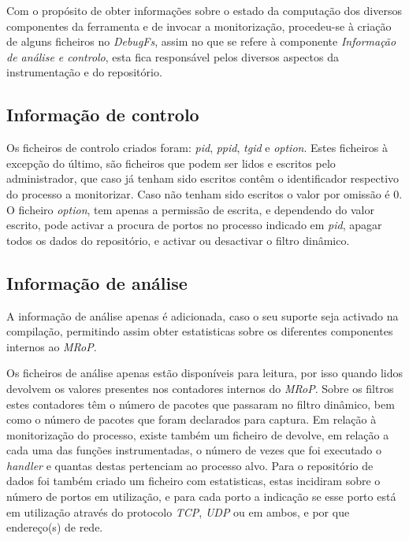 Com o propósito de obter informações sobre o estado da computação dos diversos componentes da ferramenta e de invocar a monitorização, procedeu-se à criação de alguns ficheiros no \textit{DebugFs}, assim no que se refere à componente \textit{Informação de análise e controlo}, esta fica responsável pelos diversos aspectos da instrumentação e do repositório.

\subsection{Informação de controlo}

Os ficheiros de controlo criados foram: \textit{pid}, \textit{ppid}, \textit{tgid} e \textit{option}.
Estes ficheiros à excepção do último, são ficheiros que podem ser lidos e escritos pelo administrador, que caso já tenham sido escritos contêm o identificador respectivo do processo a monitorizar.
Caso não tenham sido escritos o valor por omissão é 0.
O ficheiro \textit{option}, tem apenas a permissão de escrita, e dependendo do valor escrito, pode activar a procura de portos no processo indicado em \textit{pid}, apagar todos os dados do repositório, e activar ou desactivar o filtro dinâmico.

\subsection{Informação de análise}
A informação de análise apenas é adicionada, caso o seu suporte seja activado na compilação, permitindo assim obter estatisticas sobre os diferentes componentes internos ao \textit{MRoP}.

Os ficheiros de análise apenas estão disponíveis para leitura, por isso quando lidos devolvem os valores presentes nos contadores internos do \textit{MRoP}.
Sobre os filtros estes contadores têm o número de pacotes que passaram no filtro dinâmico, bem como o número de pacotes que foram declarados para captura.
Em relação à monitorização do processo, existe também um ficheiro de devolve, em relação a cada uma das funções instrumentadas, o número de vezes que foi executado o \textit{handler} e quantas destas pertenciam ao processo alvo.
Para o repositório de dados foi também criado um ficheiro com estatisticas, estas incidiram sobre o número de portos em utilização, e para cada porto a indicação se esse porto está em utilização através do protocolo \textit{TCP}, \textit{UDP} ou em ambos, e por que endereço(s) de rede.



